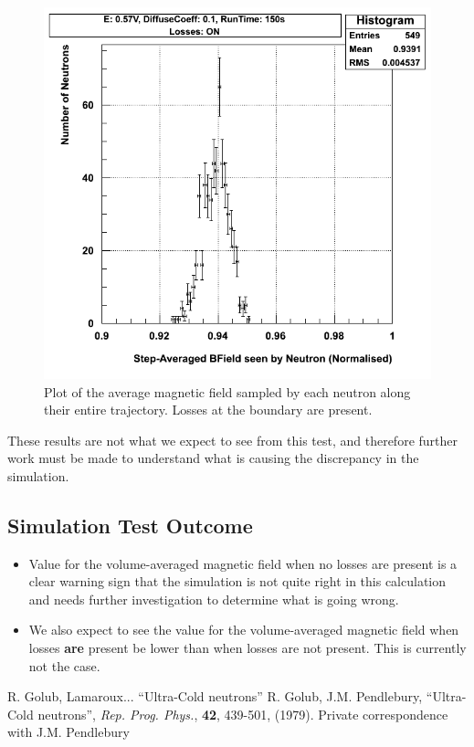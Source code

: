 \documentclass[11pt,a4paper,oneside]{article}
\begin{document}
\begin{figure}[!htbp] 	
\begin{center}
\includegraphics[scale=0.5]{figures/magfield-0_01Diff-losseson}
\end{center}
\caption{Plot of the average magnetic field sampled by each neutron along their entire trajectory. Losses at the boundary are present.}
\label{fig:avgmagfieldnolosses}
\end{figure}

These results are not what we expect to see from this test, and therefore further work must be made to understand what is causing the discrepancy in the simulation. 

\subsection*{Simulation Test Outcome}
\begin{itemize}
\item  Value for the volume-averaged magnetic field when no losses are present is a clear warning sign that the simulation is not quite right in this calculation and needs further investigation to determine what is going wrong.
\item  We also expect to see the value for the volume-averaged magnetic field when losses \textbf{are} present be lower than when losses are not present. This is currently not the case.
\end{itemize}

\pagebreak 

\begin{thebibliography}{99}
 R. Golub, Lamaroux... ``Ultra-Cold neutrons''
 R. Golub, J.M. Pendlebury, ``Ultra-Cold neutrons'', \emph{Rep. Prog. Phys.},	\textbf{42}, 439-501, (1979).
 Private correspondence with J.M. Pendlebury
\end{thebibliography}
\end{document}
